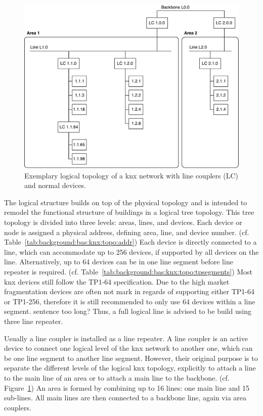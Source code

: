 \begin{figure}
	\centering
	\includegraphics[width=\textwidth]{figures/100-knx-demo-topo.pdf}
	\caption[KNX network topology]{Exemplary logical topology of a \gls{knx} network with line couplers (LC) and normal devices.}
	\label{fig:background:knx:topo}
\end{figure}

The logical structure builds on top of the physical topology and is intended to remodel the functional structure of buildings in a logical tree topology. This tree topology is divided into three levels: areas, lines, and devices. Each device or node is assigned a physical address, defining area, line, and device number. (cf. Table~\ref{tab:background:bas:knx:topo:addr})
Each device is directly connected to a line, which can accommodate up to 256 devices, if supported by all devices on the line. Alternatively, up to 64 devices can be in one line segment before line repeater is required. (cf. Table~\ref{tab:background:bas:knx:topo:tpsegments})
Most \gls{knx} devices still follow the TP1-64 specification. Due to the high market fragmentation devices are often not mark in regards of supporting either TP1-64 or TP1-256, therefore it is still recommended to only use 64 devices within a line segment. \alert{sentence too long?} Thus, a full logical line is advised to be build using three line repeater. \parencite{Sokollik2017,Merz2009}



Usually a line coupler is installed as a line repeater. A line coupler is an active device to connect one logical level of the \gls{knx} network to another one, which can be one line segment to another line segment.
However, their original purpose is to separate the different levels of the logical \gls{knx} topology, explicitly to attach a line to the main line of an area or to attach a main line to the backbone. (cf. Figure~\ref{fig:background:knx:topo})
An area is formed by combining up to 16 lines: one main line and 15 sub-lines. All main lines are then connected to a backbone line, again via area couplers. \parencite{Sokollik2017}

